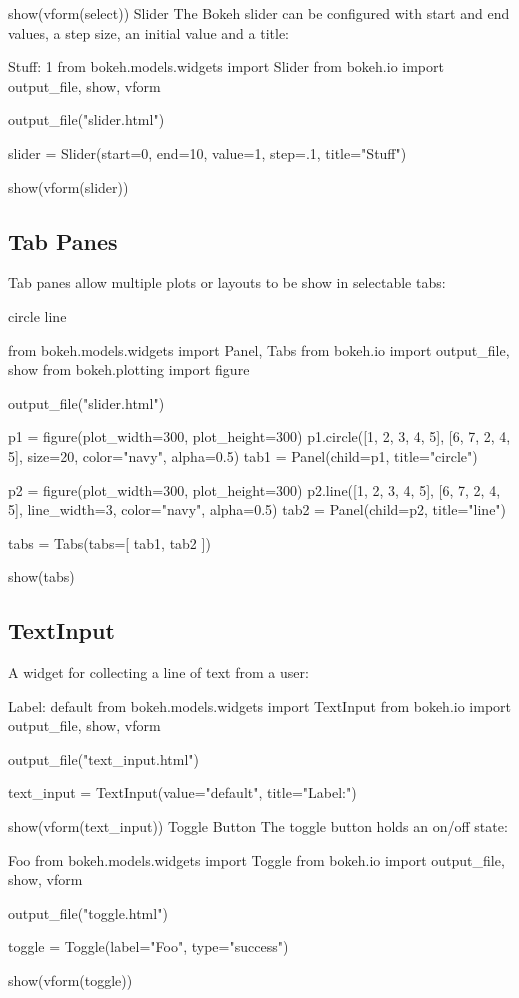 show(vform(select))
Slider
The Bokeh slider can be configured with start and end values, a step size, an initial value and a title:

Stuff:  
1
 from bokeh.models.widgets import Slider
from bokeh.io import output_file, show, vform

output_file("slider.html")

slider = Slider(start=0, end=10, value=1, step=.1, title="Stuff")

show(vform(slider))
\subsection{Tab Panes}
Tab panes allow multiple plots or layouts to be show in selectable tabs:

circle
line
	
from bokeh.models.widgets import Panel, Tabs
from bokeh.io import output_file, show
from bokeh.plotting import figure

output_file("slider.html")

p1 = figure(plot_width=300, plot_height=300)
p1.circle([1, 2, 3, 4, 5], [6, 7, 2, 4, 5], size=20, color="navy", alpha=0.5)
tab1 = Panel(child=p1, title="circle")

p2 = figure(plot_width=300, plot_height=300)
p2.line([1, 2, 3, 4, 5], [6, 7, 2, 4, 5], line_width=3, color="navy", alpha=0.5)
tab2 = Panel(child=p2, title="line")

tabs = Tabs(tabs=[ tab1, tab2 ])

show(tabs)
\subsection{TextInput}
A widget for collecting a line of text from a user:

Label: 
default
from bokeh.models.widgets import TextInput
from bokeh.io import output_file, show, vform

output_file("text_input.html")

text_input = TextInput(value="default", title="Label:")

show(vform(text_input))
Toggle Button
The toggle button holds an on/off state:

Foo
from bokeh.models.widgets import Toggle
from bokeh.io import output_file, show, vform

output_file("toggle.html")

toggle = Toggle(label="Foo", type="success")

show(vform(toggle))
